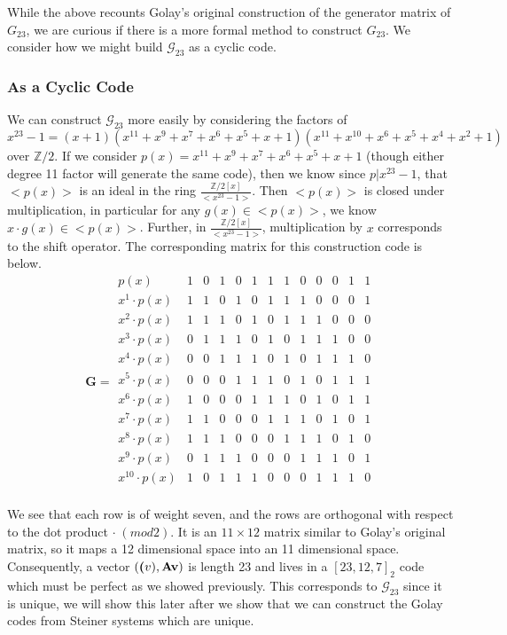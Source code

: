 \documentclass[paper=a4, fontsize=11pt]{scrartcl} %
\numberwithin{equation}{section} %
\numberwithin{figure}{section} %
\numberwithin{table}{section} %
\theoremstyle{break}
\begin{document}
While the above recounts Golay's original construction of the generator matrix of $G_{23}$, we are curious if there is a more formal method to construct $G_{23}$. We consider how we might build $\mathcal{G}_{23}$ as a cyclic code.

\subsubsection{As a Cyclic Code}
We can construct $\mathcal{G}_{23}$ more easily by considering the factors of $$x^{23}-1=(x+1)(x^{11}+x^9+x^7+x^6+x^5+x+1)(x^{11}+x^{10}+x^6+x^5+x^4+x^2+1)$$ over $\mathbb{Z}/2$. If we consider $p(x)=x^{11}+x^9+x^7+x^6+x^5+x+1$ (though either degree 11 factor will generate the same code), then we know since $p|x^{23}-1$, that $<p(x)>$ is an ideal in the ring $\frac{\mathbb{Z}/2[x]}{<x^{23}-1>}$. Then $<p(x)>$ is closed under multiplication, in particular for any $g(x)\in<p(x)>$, we know $x \cdot g(x)\in<p(x)>$. Further, in $\frac{\mathbb{Z}/2[x]}{<x^{23}-1>}$, multiplication by $x$ corresponds to the shift operator. The corresponding matrix for this construction code is below.
$$\textbf{G} = \begin{array}{ccccccccccccc}
             p(x) & 1 & 0 & 1 & 0 & 1 & 1 & 1 & 0 & 0 & 0 & 1 & 1\\
   x^1 \cdot p(x) & 1 & 1 & 0 & 1 & 0 & 1 & 1 & 1 & 0 & 0 & 0 & 1\\
   x^2 \cdot p(x) & 1 & 1 & 1 & 0 & 1 & 0 & 1 & 1 & 1 & 0 & 0 & 0\\
   x^3 \cdot p(x) & 0 & 1 & 1 & 1 & 0 & 1 & 0 & 1 & 1 & 1 & 0 & 0\\
   x^4 \cdot p(x) & 0 & 0 & 1 & 1 & 1 & 0 & 1 & 0 & 1 & 1 & 1 & 0\\
   x^5 \cdot p(x) & 0 & 0 & 0 & 1 & 1 & 1 & 0 & 1 & 0 & 1 & 1 & 1\\
   x^6 \cdot p(x) & 1 & 0 & 0 & 0 & 1 & 1 & 1 & 0 & 1 & 0 & 1 & 1\\
   x^7 \cdot p(x) & 1 & 1 & 0 & 0 & 0 & 1 & 1 & 1 & 0 & 1 & 0 & 1\\
   x^8 \cdot p(x) & 1 & 1 & 1 & 0 & 0 & 0 & 1 & 1 & 1 & 0 & 1 & 0\\
   x^9 \cdot p(x) & 0 & 1 & 1 & 1 & 0 & 0 & 0 & 1 & 1 & 1 & 0 & 1\\
x^{10} \cdot p(x) & 1 & 0 & 1 & 1 & 1 & 0 & 0 & 0 & 1 & 1 & 1 & 0\\
\end{array}$$

We see that each row is of weight seven, and the rows are orthogonal with respect to the dot product $\cdot \; (mod 2)$. It is an $11 \times 12$ matrix similar to Golay's original matrix, so it maps a 12 dimensional space into an 11 dimensional space. Consequently, a vector $(\textbf(v), \textbf{Av})$ is length 23 and lives in a $[23,12,7]_2$ code which must be perfect as we showed previously. This corresponds to $\mathcal{G}_{23}$ since it is unique, we will show this later after we show that we can construct the Golay codes from Steiner systems which are unique.
\end{document}

